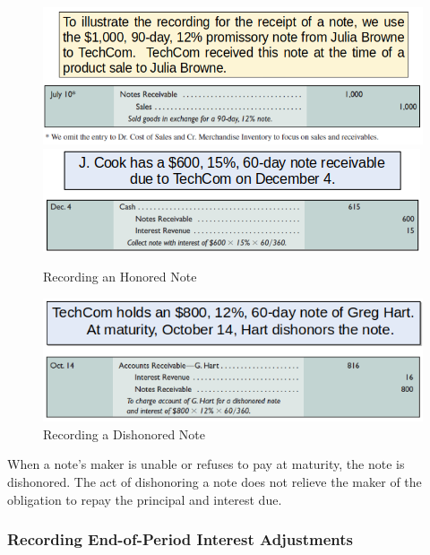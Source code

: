 \documentclass[../main.tex]{subfiles}
\begin{document}
	\begin{figure}[ht]
		\centering
		\includegraphics[width=1\columnwidth]{images/c6/notes_receivable_eg.png}
		\includegraphics[width=1\columnwidth]{images/c6/honored_note_eg.png}
		\caption{Recording an Honored Note}
		\includegraphics[width=1\columnwidth]{images/c6/dishonored_note_eg.png}
		\caption{Recording a Dishonored Note}
	\end{figure}
	
	When a note’s maker is unable or refuses to pay at maturity, the note is 
	dishonored. The act of dishonoring a note does not relieve the maker of the 
	obligation to repay the principal and interest due.
	
	\subsubsection{Recording End-of-Period Interest Adjustments}
	
\end{document}
